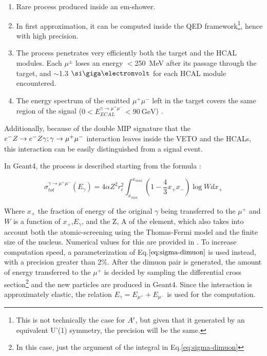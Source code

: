 \begin{enumerate}
\item Rare process produced inside an em-shower.
\item In first approximation, it can be computed inside the QED framework\footnote{This is not technically the case for $A'$, but given that it generated by an equivalent U'(1) symmetry, the precision will be the same.}, hence with high precision.
\item The process penetrates very efficiently both the target and the HCAL modules. Each $\mu^{\pm}$ loses an energy $<$\SI{250}{\mega\electronvolt} after its passage through the target, and $\sim$1.3 $\gev$ for each HCAL module encountered. 
\item The energy spectrum of the emitted $\mu^+\mu^-$ left in the target covers the same region of the signal ($0 < E_{ECAL}^{\gamma \to \mu^+ \mu^-} < \SI{90}{\giga\electronvolt}$) \cite{dimuon-mc}.
\end{enumerate}

Additionally, because of the double MIP signature that the $e^- Z \to e^- Z \gamma; \gamma \to \mu^+ \mu^-$ interaction leaves inside the VETO and the HCALs, this interaction can be easily distinguished from a signal event.

In Geant4, the process is described starting from the formula \cite{dimuon-mc}:

\begin{equation}
  \label{eq:sigma-dimuon}
  \sigma_{tot}^{\gamma \to \mu^+ \mu^-}(E_{\gamma}) = 4\alpha Z^2 r^2_c\int^{x_{max}}_{x_{min}} \left(1 - \frac{4}{3}x_+x_- \right) \log{W}dx_+
\end{equation}

Where $x_+$ the fraction of energy of the original $\gamma$ being transferred to the $\mu^+$ and $W$ is a function of $x_+$,$E_{\gamma}$, and the Z, A of the element, which also takes into account both the atomic-screening using the Thomas-Fermi model and the finite size of the nucleus. Numerical values for this are provided in \cite{dimuon-mc}. To increase computation speed, a parameterization of Eq.$\ref{eq:sigma-dimuon}$ is used instead, with a precision greater than 2\%. After the dimuon pair is generated, the amount of energy transferred to the $\mu^+$ is decided by sampling the differential cross section\footnote{In this case, just the argument of the integral in Eq.\ref{eq:sigma-dimuon}} and the new particles are produced in Geant4. Since the interaction is approximately elastic, the relation $E_{\gamma} = E_{\mu^+} + E_{\mu^-}$ is used for the computation.

